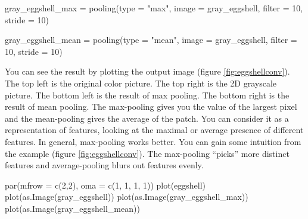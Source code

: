 \documentclass[
  12pt,
]{krantz}
\makeatletter
\newenvironment{Shaded}{\begin{snugshade}}{\end{snugshade}}
\newcommand{\AttributeTok}[1]{\textcolor[rgb]{0.61,0.61,0.61}{#1}}
\newcommand{\DecValTok}[1]{\textcolor[rgb]{0.06,0.06,0.06}{#1}}
\newcommand{\FunctionTok}[1]{\textcolor[rgb]{0,0,0}{#1}}
\newcommand{\NormalTok}[1]{#1}
\newcommand{\OtherTok}[1]{\textcolor[rgb]{0.37,0.37,0.37}{#1}}
\newcommand{\StringTok}[1]{\textcolor[rgb]{0.5,0.5,0.5}{#1}}
\newenvironment{kframe}{%
\medskip{}
\setlength{\fboxsep}{.8em}
 \def\at@end@of@kframe{}%
 \ifinner\ifhmode%
  \def\at@end@of@kframe{\end{minipage}}%
  \begin{minipage}{\columnwidth}%
 \fi\fi%
 \def\FrameCommand##1{\hskip\@totalleftmargin \hskip-\fboxsep
 \colorbox{shadecolor}{##1}\hskip-\fboxsep
     \hskip-\linewidth \hskip-\@totalleftmargin \hskip\columnwidth}%
 \MakeFramed {\advance\hsize-\width
   \@totalleftmargin\z@ \linewidth\hsize
   \@setminipage}}%
 {\par\unskip\endMakeFramed%
 \at@end@of@kframe}
\renewenvironment{Shaded}{\begin{kframe}}{\end{kframe}}
\makeatother
\begin{document}
\begin{Shaded}
\begin{Highlighting}[]
\NormalTok{gray\_eggshell\_max }\OtherTok{=} \FunctionTok{pooling}\NormalTok{(}\AttributeTok{type =} \StringTok{"max"}\NormalTok{,}
                            \AttributeTok{image =}\NormalTok{ gray\_eggshell,}
                            \AttributeTok{filter =} \DecValTok{10}\NormalTok{, }\AttributeTok{stride =} \DecValTok{10}\NormalTok{)}

\NormalTok{gray\_eggshell\_mean }\OtherTok{=} \FunctionTok{pooling}\NormalTok{(}\AttributeTok{type =} \StringTok{"mean"}\NormalTok{,}
                             \AttributeTok{image =}\NormalTok{ gray\_eggshell,}
                             \AttributeTok{filter =} \DecValTok{10}\NormalTok{, }\AttributeTok{stride =} \DecValTok{10}\NormalTok{)}
\end{Highlighting}
\end{Shaded}

You can see the result by plotting the output image (figure \ref{fig:eggshellconv}). The top left is the original color picture. The top right is the 2D grayscale picture. The bottom left is the result of max pooling. The bottom right is the result of mean pooling. The max-pooling gives you the value of the largest pixel and the mean-pooling gives the average of the patch. You can consider it as a representation of features, looking at the maximal or average presence of different features. In general, max-pooling works better. You can gain some intuition from the example (figure \ref{fig:eggshellconv}). The max-pooling ``picks'' more distinct features and average-pooling blurs out features evenly.

\begin{Shaded}
\begin{Highlighting}[]
\FunctionTok{par}\NormalTok{(}\AttributeTok{mfrow =} \FunctionTok{c}\NormalTok{(}\DecValTok{2}\NormalTok{,}\DecValTok{2}\NormalTok{), }\AttributeTok{oma =} \FunctionTok{c}\NormalTok{(}\DecValTok{1}\NormalTok{, }\DecValTok{1}\NormalTok{, }\DecValTok{1}\NormalTok{, }\DecValTok{1}\NormalTok{))}
\FunctionTok{plot}\NormalTok{(eggshell)}
\FunctionTok{plot}\NormalTok{(}\FunctionTok{as.Image}\NormalTok{(gray\_eggshell))}
\FunctionTok{plot}\NormalTok{(}\FunctionTok{as.Image}\NormalTok{(gray\_eggshell\_max))}
\FunctionTok{plot}\NormalTok{(}\FunctionTok{as.Image}\NormalTok{(gray\_eggshell\_mean))}
\end{Highlighting}
\end{Shaded}
\end{document}
